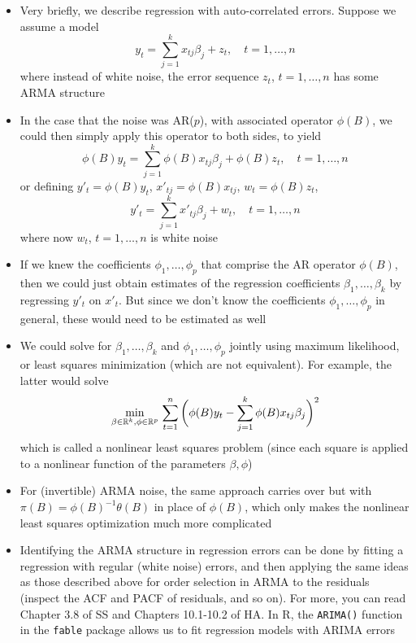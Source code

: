 \documentclass{article}
\begin{document}
\begin{itemize}
\item Very briefly, we describe regression with auto-correlated errors. Suppose
  we assume a model 
  \[
  y_t = \sum_{j=1}^k x_{tj} \beta_j + z_t, \quad t = 1,\dots,n
  \]
  where instead of white noise, the error sequence $z_t$, $t = 1,\dots,n$ has
  some ARMA structure

\item In the case that the noise was AR($p$), with associated operator
  $\phi(B)$, we could then simply apply this operator to both sides, to yield 
  \[
  \phi(B) y_t = \sum_{j=1}^k \phi(B) x_{tj} \beta_j + \phi(B) z_t, \quad t =
  1,\dots,n  
  \]
  or defining $y'_t = \phi(B) y_t$, $x'_{tj} = \phi(B) x_{tj}$, $w_t = \phi(B)
  z_t$,  
  \[
  y'_t = \sum_{j=1}^k x'_{tj} \beta_j + w_t, \quad t = 1,\dots,n
  \]
  where now $w_t$, $t = 1,\dots,n$ is white noise

\item If we knew the coefficients $\phi_1,\dots,\phi_p$ that comprise the AR
  operator $\phi(B)$, then we could just obtain estimates of the regression
  coefficients $\beta_1,\dots,\beta_k$ by regressing $y'_t$ on $x'_t$. But since
  we don't know the coefficients $\phi_1,\dots,\phi_p$ in general, these would
  need to be estimated as well

\item We could solve for $\beta_1,\dots,\beta_k$ and $\phi_1,\dots,\phi_p$
  jointly using maximum likelihood, or least squares minimization (which are not
  equivalent). For example, the latter would solve  
  \[
  \min_{\beta \in \mathbb{R}^k, \phi \in \mathbb{R}^p} \, \sum_{t=1}^n \bigg( \phi(B) y_t -
  \sum_{j=1}^k \phi(B) x_{tj} \beta_j \bigg)^2
  \]
  which is called a nonlinear least squares problem (since each square is
  applied to a nonlinear function of the parameters $\beta,\phi$)

\item For (invertible) ARMA noise, the same approach carries over but with
  $\pi(B) = \phi(B)^{-1} \theta(B)$ in place of $\phi(B)$, which only makes the
  nonlinear least squares optimization much more complicated

\item Identifying the ARMA structure in regression errors can be done by fitting
  a regression with regular (white noise) errors, and then applying the same
  ideas as those described above for order selection in ARMA to the residuals
  (inspect the ACF and PACF of residuals, and so on). For more, you can read
  Chapter 3.8 of SS and Chapters 10.1-10.2 of HA. In R, the \verb|ARIMA()|
  function in the \verb|fable| package allows us to fit regression models with
  ARIMA errors  
\end{itemize}
\end{document}
